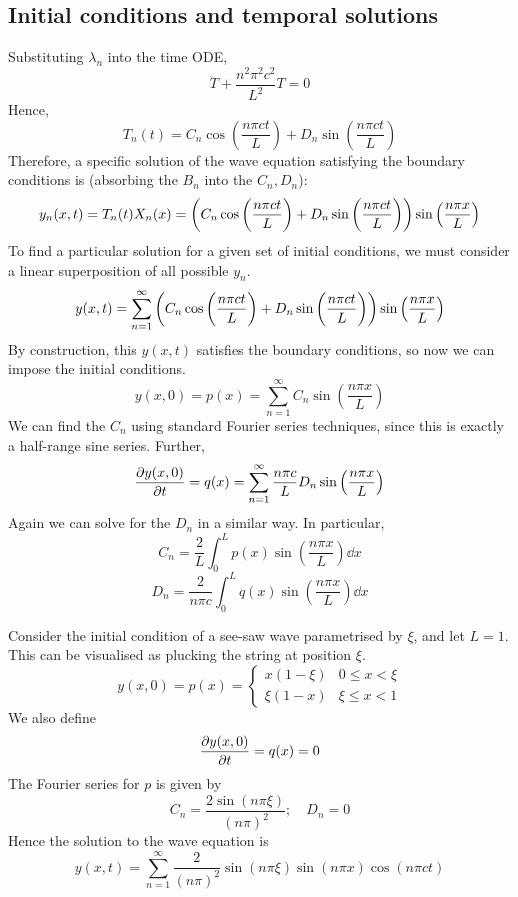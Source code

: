 \documentclass[a4paper]{article}
\begin{document}
\subsection{Initial conditions and temporal solutions}
Substituting \( \lambda_n \) into the time ODE,
\[
	\ddot T + \frac{n^2 \pi^2 c^2}{L^2}T = 0
\]
Hence,
\[
	T_n(t) = C_n \cos \left(\frac{n \pi c t}{L}\right) + D_n \sin \left(\frac{n \pi c t}{L}\right)
\]
Therefore, a specific solution of the wave equation satisfying the boundary conditions is (absorbing the \( B_n \) into the \( C_n, D_n \)):
\[
	y_n(x,t) = T_n(t) X_n(x) = \qty(C_n \cos \left(\frac{n \pi c t}{L}\right) + D_n \sin \left(\frac{n \pi c t}{L}\right)) \sin \left(\frac{n \pi x}{L}\right)
\]
To find a particular solution for a given set of initial conditions, we must consider a linear superposition of all possible \( y_n \).
\[
	y(x,t) = \sum_{n=1}^\infty \qty(C_n \cos \left(\frac{n \pi c t}{L}\right) + D_n \sin \left(\frac{n \pi c t}{L}\right)) \sin \left(\frac{n \pi x}{L}\right)
\]
By construction, this \( y(x,t) \) satisfies the boundary conditions, so now we can impose the initial conditions.
\[
	y(x,0) = p(x) = \sum_{n=1}^\infty C_n \sin \left(\frac{n \pi x}{L}\right)
\]
We can find the \( C_n \) using standard Fourier series techniques, since this is exactly a half-range sine series.
Further,
\[
	\pdv{y(x,0)}{t} = q(x) = \sum_{n=1}^\infty \frac{n \pi c}{L} D_n \sin \left(\frac{n \pi x}{L}\right)
\]
Again we can solve for the \( D_n \) in a similar way.
In particular,
\[
	C_n = \frac{2}{L} \int_0^L p(x) \sin \left(\frac{n \pi x}{L}\right) \dd{x}
\]
\[
	D_n = \frac{2}{n \pi c} \int_0^L q(x) \sin \left(\frac{n \pi x}{L}\right) \dd{x}
\]
\begin{example}
	Consider the initial condition of a see-saw wave parametrised by \( \xi \), and let \( L = 1 \).
	This can be visualised as plucking the string at position \( \xi \).
	\[
		y(x,0) = p(x) = \begin{cases}
			x(1-\xi) & 0 \leq x < \xi \\
			\xi(1-x) & \xi \leq x < 1
		\end{cases}
	\]
	We also define
	\[
		\pdv{y(x,0)}{t} = q(x) = 0
	\]
	The Fourier series for \( p \) is given by
	\[
		C_n = \frac{2 \sin (n \pi \xi)}{(n \pi)^2};\quad D_n = 0
	\]
	Hence the solution to the wave equation is
	\[
		y(x,t) = \sum_{n=1}^\infty \frac{2}{(n \pi)^2} \sin (n \pi \xi) \sin (n \pi x) \cos (n \pi c t)
	\]
\end{example}
\end{document}
